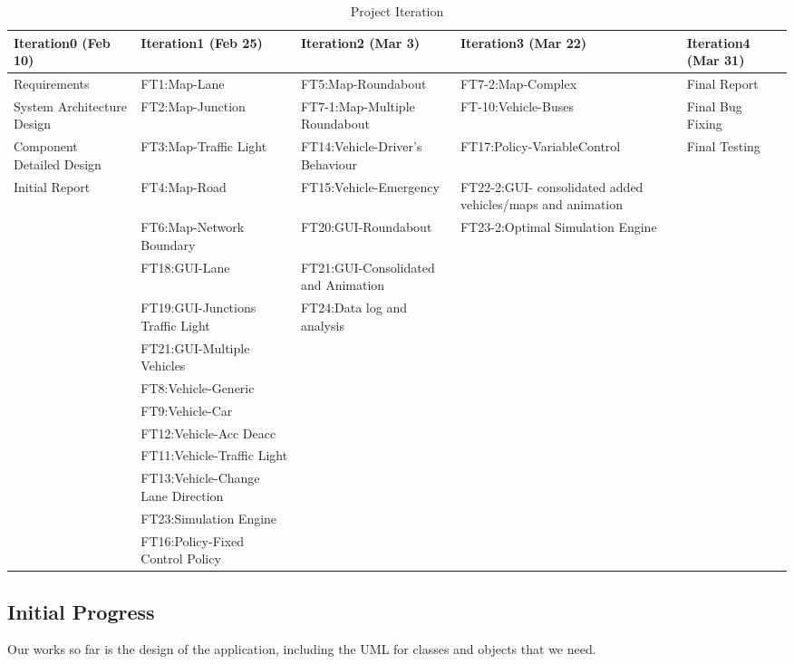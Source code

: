 \documentclass[11pt]{article}
\begin{document}
\begin{table}[p]
		\caption{Project Iteration}
		\centering
		\begin{tabular}{p{2.5cm}|p{4cm}|p{2.5cm}|p{2.5cm}|p{2cm}}
		\hline\hline
		Iteration0 (Feb 10) & Iteration1 (Feb 25) & Iteration2 (Mar 3) & Iteration3 (Mar 22) & Iteration4 (Mar 31)\\ [0.5ex]
		\hline
		
		Requirements & FT1:Map-Lane & FT5:Map-Roundabout & FT7-2:Map-Complex & Final Report\\[1ex]
		
		System Architecture Design & FT2:Map-Junction & FT7-1:Map-Multiple Roundabout & FT-10:Vehicle-Buses & Final Bug Fixing\\ [1ex]
		
		Component Detailed Design & FT3:Map-Traffic Light & FT14:Vehicle-Driver's Behaviour & FT17:Policy-VariableControl & Final Testing\\ [1ex]
		
		Initial Report & FT4:Map-Road & FT15:Vehicle-Emergency & FT22-2:GUI- consolidated added vehicles/maps and animation \\[1ex]
		
		& FT6:Map-Network Boundary & FT20:GUI-Roundabout & FT23-2:Optimal Simulation Engine \\[1ex] 
		
		& FT18:GUI-Lane & FT21:GUI-Consolidated and Animation & \\[1ex]
		
		& FT19:GUI-Junctions Traffic Light & FT24:Data log and analysis & &\\[1ex]
		& FT21:GUI-Multiple Vehicles &&&\\
		& FT8:Vehicle-Generic &&& \\
		& FT9:Vehicle-Car &&& \\
		& FT12:Vehicle-Acc Deacc &&& \\
		& FT11:Vehicle-Traffic Light &&& \\
		& FT13:Vehicle-Change Lane Direction &&& \\
		& FT23:Simulation Engine &&& \\
		& FT16:Policy-Fixed Control Policy &&&\\
		
		\hline
		\end{tabular}
		\label{table:iteration} 
		\end{table}

	
\subsection{Initial Progress}
Our works so far is the design of the application, including the UML for classes and objects that we need. 
\end{document}
